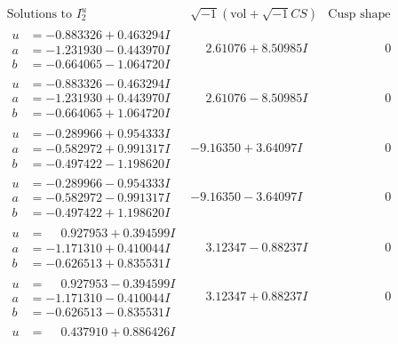 \documentclass[1p]{elsarticle_modified}
\theoremstyle{definition}
\newcommand{\I}{\sqrt{-1}}
\begin{document}
$$\begin{array}{c|c|c}  
\text{Solutions to }I^u_{2}& \I (\text{vol} + \sqrt{-1}CS) & \text{Cusp shape}\\
 \hline 
\begin{aligned}
u &= -0.883326 + 0.463294 I \\
a &= -1.231930 - 0.443970 I \\
b &= -0.664065 - 1.064720 I\end{aligned}
 & \phantom{-}2.61076 + 8.50985 I & \phantom{-0.000000 } 0 \\ \hline\begin{aligned}
u &= -0.883326 - 0.463294 I \\
a &= -1.231930 + 0.443970 I \\
b &= -0.664065 + 1.064720 I\end{aligned}
 & \phantom{-}2.61076 - 8.50985 I & \phantom{-0.000000 } 0 \\ \hline\begin{aligned}
u &= -0.289966 + 0.954333 I \\
a &= -0.582972 + 0.991317 I \\
b &= -0.497422 - 1.198620 I\end{aligned}
 & -9.16350 + 3.64097 I & \phantom{-0.000000 } 0 \\ \hline\begin{aligned}
u &= -0.289966 - 0.954333 I \\
a &= -0.582972 - 0.991317 I \\
b &= -0.497422 + 1.198620 I\end{aligned}
 & -9.16350 - 3.64097 I & \phantom{-0.000000 } 0 \\ \hline\begin{aligned}
u &= \phantom{-}0.927953 + 0.394599 I \\
a &= -1.171310 + 0.410044 I \\
b &= -0.626513 + 0.835531 I\end{aligned}
 & \phantom{-}3.12347 - 0.88237 I & \phantom{-0.000000 } 0 \\ \hline\begin{aligned}
u &= \phantom{-}0.927953 - 0.394599 I \\
a &= -1.171310 - 0.410044 I \\
b &= -0.626513 - 0.835531 I\end{aligned}
 & \phantom{-}3.12347 + 0.88237 I & \phantom{-0.000000 } 0 \\ \hline\begin{aligned}
u &= \phantom{-}0.437910 + 0.886426 I \\

\end{aligned}
\end{array}$$
\end{document}
